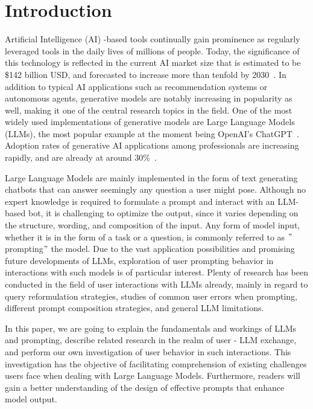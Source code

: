 \section{Introduction}
\label{sec:introduction}

\sloppy %
Artificial Intelligence (AI) -based tools continually gain prominence as regularly leveraged tools in the
daily lives of millions of people.
Today, the significance of this technology is reflected in the current AI market size that is
estimated to be \$142 billion USD, and forecasted to increase more than tenfold by 2030~\cite{statista_artificial_2023}.
In addition to typical AI applications such as recommendation systems or autonomous agents, generative
models are notably increasing in popularity as well, making it one of the central research topics
in the field.
One of the most widely used implementations of generative models are Large Language Models (LLMs),
the most popular example at the moment being OpenAI's ChatGPT~\cite{openai_chatgpt_2023}.
Adoption rates of generative AI applications among professionals are increasing rapidly, and are
already at
around 30\%~\cite{statista_us_2022}.

Large Language Models are mainly implemented in the form of text generating chatbots that can
answer seemingly any question a user might pose.
Although no expert knowledge is required to formulate a prompt and interact with an LLM-based bot, it is challenging to optimize the output, since it varies depending on the structure, wording,
and composition of the input. %
Any form of model input, whether it is in the form of a task or a question, is commonly
referred to as \("\)prompting\("\) the model.
Due to the vast application possibilities and promising future developments of LLMs, exploration of
user prompting behavior in interactions with such models is of particular interest.
Plenty of research has been conducted in the field of user interactions with LLMs already,
mainly in regard to query reformulation strategies, studies of common user errors when prompting,
different prompt composition strategies, and general LLM limitations.

In this paper, we are going to explain the fundamentals and workings of LLMs and prompting,
describe related research in the realm of user - LLM exchange, and perform our own investigation of
user behavior in such interactions.
This investigation has the objective of facilitating comprehension of existing challenges users
face when dealing with Large Language Models.
Furthermore, readers will gain a better understanding of the design of effective prompts that
enhance model output.

